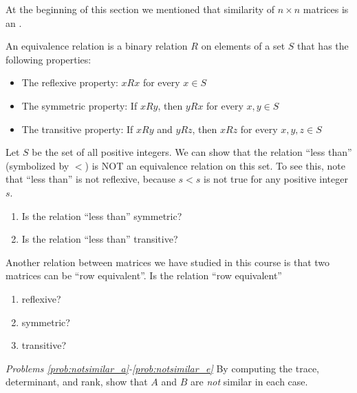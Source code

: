 \documentclass{ximera}
\begin{document}
\begin{problem}\label{prob:lessthan}
At the beginning of this section we mentioned that similarity of $n \times n$ matrices is an .

An equivalence relation is a binary relation $R$ on elements of a set $S$ that has the following properties:
\begin{itemize}
\item The reflexive property:  $x R x$ for every $x \in S$
\item The symmetric property:  If $x R y$, then $y R x$ for every $x,y \in S$
\item The transitive property:  If $x R y$ and $y R z$, then $x R z$ for every $x,y,z \in S$
\end{itemize}

Let $S$ be the set of all positive integers.  We can show that the relation ``less than'' (symbolized by $<$) is NOT an equivalence relation on this set.  To see this, note that ``less than'' is not reflexive, because $s<s$ is not true for any positive integer $s$.

\begin{enumerate}
\item
Is the relation ``less than'' symmetric? 
\item
Is the relation ``less than'' transitive? 
\end{enumerate}
\end{problem}

\begin{problem}\label{prob:lessthan3}
Another relation between matrices we have studied in this course is that two matrices can be ``row equivalent''.  Is the relation ``row equivalent'' 
\begin{enumerate}
    \item reflexive? 
    \item symmetric? 
    \item transitive? 
\end{enumerate}

\end{problem}

\emph{Problems \ref{prob:notsimilar_a}-\ref{prob:notsimilar_e}}
By computing the trace, determinant, and rank, show that $A$ and $B$ are \textit{not} similar in each case.
\end{document}

